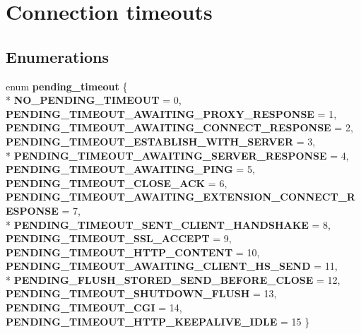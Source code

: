 \hypertarget{group__timeout}{}\section{Connection timeouts}
\label{group__timeout}
\subsection*{Enumerations}
\begin{DoxyCompactItemize}
\item 
enum {\bfseries pending\+\_\+timeout} \{ \\*
{\bfseries N\+O\+\_\+\+P\+E\+N\+D\+I\+N\+G\+\_\+\+T\+I\+M\+E\+O\+UT} = 0, 
{\bfseries P\+E\+N\+D\+I\+N\+G\+\_\+\+T\+I\+M\+E\+O\+U\+T\+\_\+\+A\+W\+A\+I\+T\+I\+N\+G\+\_\+\+P\+R\+O\+X\+Y\+\_\+\+R\+E\+S\+P\+O\+N\+SE} = 1, 
{\bfseries P\+E\+N\+D\+I\+N\+G\+\_\+\+T\+I\+M\+E\+O\+U\+T\+\_\+\+A\+W\+A\+I\+T\+I\+N\+G\+\_\+\+C\+O\+N\+N\+E\+C\+T\+\_\+\+R\+E\+S\+P\+O\+N\+SE} = 2, 
{\bfseries P\+E\+N\+D\+I\+N\+G\+\_\+\+T\+I\+M\+E\+O\+U\+T\+\_\+\+E\+S\+T\+A\+B\+L\+I\+S\+H\+\_\+\+W\+I\+T\+H\+\_\+\+S\+E\+R\+V\+ER} = 3, 
\\*
{\bfseries P\+E\+N\+D\+I\+N\+G\+\_\+\+T\+I\+M\+E\+O\+U\+T\+\_\+\+A\+W\+A\+I\+T\+I\+N\+G\+\_\+\+S\+E\+R\+V\+E\+R\+\_\+\+R\+E\+S\+P\+O\+N\+SE} = 4, 
{\bfseries P\+E\+N\+D\+I\+N\+G\+\_\+\+T\+I\+M\+E\+O\+U\+T\+\_\+\+A\+W\+A\+I\+T\+I\+N\+G\+\_\+\+P\+I\+NG} = 5, 
{\bfseries P\+E\+N\+D\+I\+N\+G\+\_\+\+T\+I\+M\+E\+O\+U\+T\+\_\+\+C\+L\+O\+S\+E\+\_\+\+A\+CK} = 6, 
{\bfseries P\+E\+N\+D\+I\+N\+G\+\_\+\+T\+I\+M\+E\+O\+U\+T\+\_\+\+A\+W\+A\+I\+T\+I\+N\+G\+\_\+\+E\+X\+T\+E\+N\+S\+I\+O\+N\+\_\+\+C\+O\+N\+N\+E\+C\+T\+\_\+\+R\+E\+S\+P\+O\+N\+SE} = 7, 
\\*
{\bfseries P\+E\+N\+D\+I\+N\+G\+\_\+\+T\+I\+M\+E\+O\+U\+T\+\_\+\+S\+E\+N\+T\+\_\+\+C\+L\+I\+E\+N\+T\+\_\+\+H\+A\+N\+D\+S\+H\+A\+KE} = 8, 
{\bfseries P\+E\+N\+D\+I\+N\+G\+\_\+\+T\+I\+M\+E\+O\+U\+T\+\_\+\+S\+S\+L\+\_\+\+A\+C\+C\+E\+PT} = 9, 
{\bfseries P\+E\+N\+D\+I\+N\+G\+\_\+\+T\+I\+M\+E\+O\+U\+T\+\_\+\+H\+T\+T\+P\+\_\+\+C\+O\+N\+T\+E\+NT} = 10, 
{\bfseries P\+E\+N\+D\+I\+N\+G\+\_\+\+T\+I\+M\+E\+O\+U\+T\+\_\+\+A\+W\+A\+I\+T\+I\+N\+G\+\_\+\+C\+L\+I\+E\+N\+T\+\_\+\+H\+S\+\_\+\+S\+E\+ND} = 11, 
\\*
{\bfseries P\+E\+N\+D\+I\+N\+G\+\_\+\+F\+L\+U\+S\+H\+\_\+\+S\+T\+O\+R\+E\+D\+\_\+\+S\+E\+N\+D\+\_\+\+B\+E\+F\+O\+R\+E\+\_\+\+C\+L\+O\+SE} = 12, 
{\bfseries P\+E\+N\+D\+I\+N\+G\+\_\+\+T\+I\+M\+E\+O\+U\+T\+\_\+\+S\+H\+U\+T\+D\+O\+W\+N\+\_\+\+F\+L\+U\+SH} = 13, 
{\bfseries P\+E\+N\+D\+I\+N\+G\+\_\+\+T\+I\+M\+E\+O\+U\+T\+\_\+\+C\+GI} = 14, 
{\bfseries P\+E\+N\+D\+I\+N\+G\+\_\+\+T\+I\+M\+E\+O\+U\+T\+\_\+\+H\+T\+T\+P\+\_\+\+K\+E\+E\+P\+A\+L\+I\+V\+E\+\_\+\+I\+D\+LE} = 15
 \}\hypertarget{group__timeout_ga2c0aa4b9c3c55bae7b35cbfac3246c87}{}\label{group__timeout_ga2c0aa4b9c3c55bae7b35cbfac3246c87}

\end{DoxyCompactItemize}
